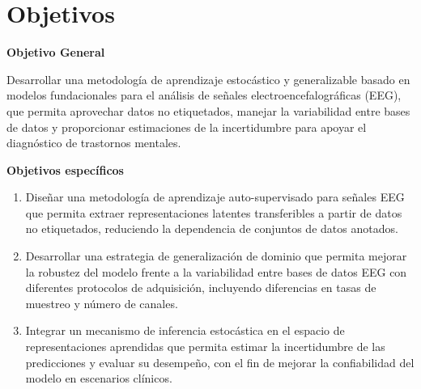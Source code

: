 \section{Objetivos}

\textbf{Objetivo General}

Desarrollar una metodología de aprendizaje estocástico y generalizable basado en modelos fundacionales para el análisis de señales electroencefalográficas (EEG), que permita aprovechar datos no etiquetados, manejar la variabilidad entre bases de datos y proporcionar estimaciones de la incertidumbre para apoyar el diagnóstico de trastornos mentales.

\textbf{Objetivos específicos}

\begin{enumerate}
	\item Diseñar una metodología de aprendizaje auto-supervisado para señales EEG que permita extraer representaciones latentes transferibles a partir de datos no etiquetados, reduciendo la dependencia de conjuntos de datos anotados.
	
	\item Desarrollar una estrategia de generalización de dominio que permita mejorar la robustez del modelo frente a la variabilidad entre bases de datos EEG con diferentes protocolos de adquisición, incluyendo diferencias en tasas de muestreo y número de canales.
	
	\item Integrar un mecanismo de inferencia estocástica en el espacio de representaciones aprendidas que permita estimar la incertidumbre de las predicciones y evaluar su desempeño, con el fin de mejorar la confiabilidad del modelo en escenarios clínicos.
\end{enumerate}